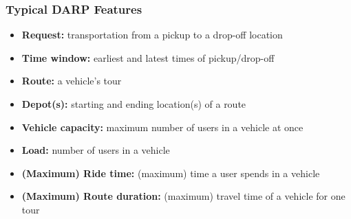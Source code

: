 \documentclass[aspectratio=1610]{beamer}
\let\oldfootnotesize\footnotesize
\renewcommand*{\footnotesize}{\oldfootnotesize\fontsize{6}{4}\selectfont}
\renewcommand{\footnotesize}{\scriptsize}
\begin{document}
\begin{frame}[noframenumbering]
	\frametitle{Typical DARP Features \footnotesize{\textcolor{gray}{\cite{Ho:2018}}}}

\begin{itemize}
	\item \textbf{Request:} transportation from a pickup to a drop-off location
	\item \textbf{Time window:} earliest and latest times of pickup/drop-off %
	\item \textbf{Route:} a vehicle's tour %
	\item \textbf{Depot(s):} starting and ending location(s) of a route 
	\item \textbf{Vehicle capacity:} maximum number of users in a vehicle at once
	\item \textbf{Load:} number of users in a vehicle
	\item \textbf{(Maximum) Ride time:} (maximum) time a user spends in a vehicle
	\item \textbf{(Maximum) Route duration:} (maximum) travel time of a vehicle for one tour
\end{itemize}
	
\end{frame}
\end{document}
